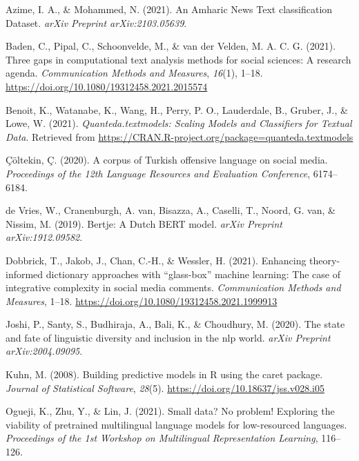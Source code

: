 \documentclass[
  english,
  man,floatsintext]{apa7}
\newlength{\cslhangindent}
\newenvironment{cslreferences}%
  {\setlength{\parindent}{0pt}%
  \everypar{\setlength{\hangindent}{\cslhangindent}}\ignorespaces}%
  {\par}
\begin{document}
\hypertarget{refs}{}
\begin{cslreferences}
\leavevmode\hypertarget{ref-azime2021amharic}{}%
Azime, I. A., \& Mohammed, N. (2021). An Amharic News Text classification Dataset. \emph{arXiv Preprint arXiv:2103.05639}.

\leavevmode\hypertarget{ref-baden:2021:TGC}{}%
Baden, C., Pipal, C., Schoonvelde, M., \& van der Velden, M. A. C. G. (2021). Three gaps in computational text analysis methods for social sciences: A research agenda. \emph{Communication Methods and Measures}, \emph{16}(1), 1--18. \url{https://doi.org/10.1080/19312458.2021.2015574}

\leavevmode\hypertarget{ref-quantedatextmodels}{}%
Benoit, K., Watanabe, K., Wang, H., Perry, P. O., Lauderdale, B., Gruber, J., \& Lowe, W. (2021). \emph{Quanteda.textmodels: Scaling Models and Classifiers for Textual Data}. Retrieved from \url{https://CRAN.R-project.org/package=quanteda.textmodels}

\leavevmode\hypertarget{ref-ccoltekin2020corpus}{}%
Çöltekin, Ç. (2020). A corpus of Turkish offensive language on social media. \emph{Proceedings of the 12th Language Resources and Evaluation Conference}, 6174--6184.

\leavevmode\hypertarget{ref-de2019bertje}{}%
de Vries, W., Cranenburgh, A. van, Bisazza, A., Caselli, T., Noord, G. van, \& Nissim, M. (2019). Bertje: A Dutch BERT model. \emph{arXiv Preprint arXiv:1912.09582}.

\leavevmode\hypertarget{ref-dobbrick:2021:ETI}{}%
Dobbrick, T., Jakob, J., Chan, C.-H., \& Wessler, H. (2021). Enhancing theory-informed dictionary approaches with ``glass-box'' machine learning: The case of integrative complexity in social media comments. \emph{Communication Methods and Measures}, 1--18. \url{https://doi.org/10.1080/19312458.2021.1999913}

\leavevmode\hypertarget{ref-joshi2020state}{}%
Joshi, P., Santy, S., Budhiraja, A., Bali, K., \& Choudhury, M. (2020). The state and fate of linguistic diversity and inclusion in the nlp world. \emph{arXiv Preprint arXiv:2004.09095}.

\leavevmode\hypertarget{ref-kuhn:2008:BPM}{}%
Kuhn, M. (2008). Building predictive models in R using the caret package. \emph{Journal of Statistical Software}, \emph{28}(5). \url{https://doi.org/10.18637/jss.v028.i05}

\leavevmode\hypertarget{ref-ogueji2021small}{}%
Ogueji, K., Zhu, Y., \& Lin, J. (2021). Small data? No problem! Exploring the viability of pretrained multilingual language models for low-resourced languages. \emph{Proceedings of the 1st Workshop on Multilingual Representation Learning}, 116--126.


\end{cslreferences}
\end{document}
